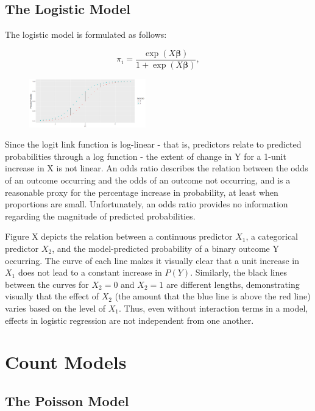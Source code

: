 \documentclass[jou, apacite]{apa6}
\begin{document}
\subsection{The Logistic Model}

The logistic model is formulated as follows:

\begin{equation} \label{log1}
\pi_i = \dfrac{\exp (X \bm{\beta})}{1 + \exp (X \bm{\beta})},
\end{equation}

\begin{figure}[h]
\includegraphics[width=0.45\textwidth]{LogisticFirstDiff.png}
\end{figure}

Since the logit link function is log-linear - that is, predictors relate to predicted probabilities through a log function - the extent of change in Y for a 1-unit increase in X is not linear. 
An odds ratio describes the relation between the odds of an outcome occurring and the odds of an outcome not occurring, and is a reasonable proxy for the percentage increase in probability, at least when proportions are small.
Unfortunately, an odds ratio provides no information regarding the magnitude of predicted probabilities.

Figure X depicts the relation between a continuous predictor $X_1$, a categorical predictor $X_2$, and the model-predicted probability of a binary outcome Y occurring. 
The curve of each line makes it visually clear that a unit increase in $X_1$ does not lead to a constant increase in $P(Y)$.
Similarly, the black lines between the curves for $X_2=0$ and $X_2=1$ are different lengths, demonstrating visually that the effect of $X_2$ (the amount that the blue line is above the red line) varies based on the level of $X_1$.
Thus, even without interaction terms in a model, effects in logistic regression are not independent from one another. 

\section{Count Models}

\subsection{The Poisson Model}
\end{document}
